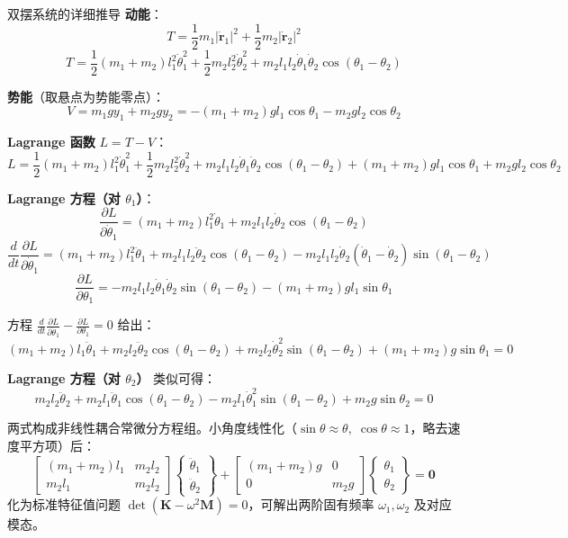 \begin{example}{双摆系统的详细推导}
	\textbf{动能}：
	\[
	T = \frac{1}{2} m_1 |\dot{\mathbf{r}}_1|^2 + \frac{1}{2} m_2 |\dot{\mathbf{r}}_2|^2
	\]
	\[
	\boxed{
	T = \frac{1}{2} (m_1 + m_2) l_1^2 \dot{\theta}_1^2 + \frac{1}{2} m_2 l_2^2 \dot{\theta}_2^2 + m_2 l_1 l_2 \dot{\theta}_1 \dot{\theta}_2 \cos(\theta_1 - \theta_2)
	}
	\]
	
	\textbf{势能}（取悬点为势能零点）：
	\[
	V = m_1 g y_1 + m_2 g y_2 = -(m_1 + m_2) g l_1 \cos\theta_1 - m_2 g l_2 \cos\theta_2
	\]
	
	\textbf{Lagrange 函数} $L = T - V$：
	\[
	L = \frac{1}{2}(m_1+m_2)l_1^2 \dot{\theta}_1^2 + \frac{1}{2}m_2 l_2^2 \dot{\theta}_2^2 + m_2 l_1 l_2 \dot{\theta}_1 \dot{\theta}_2 \cos(\theta_1-\theta_2) + (m_1+m_2)gl_1\cos\theta_1 + m_2 g l_2 \cos\theta_2
	\]
	
	\textbf{Lagrange 方程（对 $\theta_1$）}：
	\[
	\frac{\partial L}{\partial \dot{\theta}_1} = (m_1+m_2)l_1^2 \dot{\theta}_1 + m_2 l_1 l_2 \dot{\theta}_2 \cos(\theta_1-\theta_2)
	\]
	\[
	\frac{d}{dt} \frac{\partial L}{\partial \dot{\theta}_1} = (m_1+m_2)l_1^2 \ddot{\theta}_1 + m_2 l_1 l_2 \ddot{\theta}_2 \cos(\theta_1-\theta_2) - m_2 l_1 l_2 \dot{\theta}_2 (\dot{\theta}_1-\dot{\theta}_2) \sin(\theta_1-\theta_2)
	\]
	\[
	\frac{\partial L}{\partial \theta_1} = -m_2 l_1 l_2 \dot{\theta}_1 \dot{\theta}_2 \sin(\theta_1-\theta_2) - (m_1+m_2) g l_1 \sin\theta_1
	\]
	
	方程 $\frac{d}{dt}\frac{\partial L}{\partial \dot{\theta}_1} - \frac{\partial L}{\partial \theta_1} = 0$ 给出：
	\[
	\boxed{(m_1+m_2) l_1 \ddot{\theta}_1 + m_2 l_2 \ddot{\theta}_2 \cos(\theta_1-\theta_2) + m_2 l_2 \dot{\theta}_2^2 \sin(\theta_1-\theta_2) + (m_1+m_2) g \sin\theta_1 = 0}
	\]
	
	\textbf{Lagrange 方程（对 $\theta_2$）} 类似可得：
	\[
	\boxed{m_2 l_2 \ddot{\theta}_2 + m_2 l_1 \ddot{\theta}_1 \cos(\theta_1-\theta_2) - m_2 l_1 \dot{\theta}_1^2 \sin(\theta_1-\theta_2) + m_2 g \sin\theta_2 = 0}
	\]
	
	两式构成非线性耦合常微分方程组。小角度线性化（$\sin\theta \approx \theta,\; \cos\theta \approx 1$，略去速度平方项）后：
	\[
	\begin{bmatrix}
	(m_1+m_2) l_1 & m_2 l_2 \\
	m_2 l_1 & m_2 l_2
	\end{bmatrix}
	\begin{Bmatrix} \ddot{\theta}_1 \\ \ddot{\theta}_2 \end{Bmatrix} + 
	\begin{bmatrix}
	(m_1+m_2) g & 0 \\
	0 & m_2 g
	\end{bmatrix}
	\begin{Bmatrix} \theta_1 \\ \theta_2 \end{Bmatrix} = \mathbf{0}
	\]
	化为标准特征值问题 $\det(\mathbf{K} - \omega^2 \mathbf{M}) = 0$，可解出两阶固有频率 $\omega_1, \omega_2$ 及对应模态。
\end{example}

